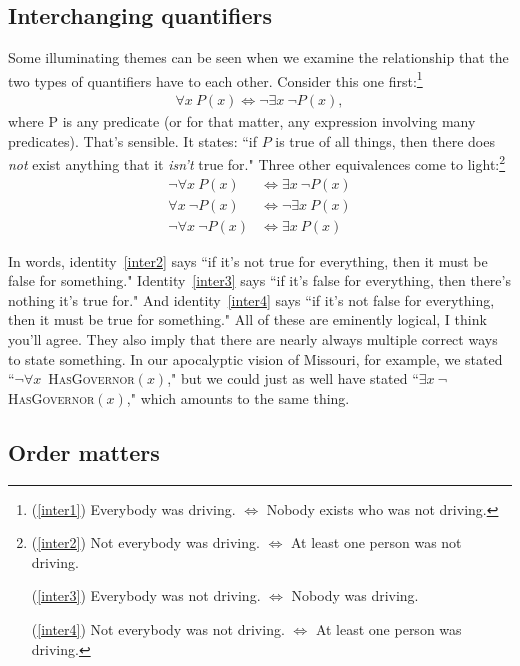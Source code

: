 \subsection{Interchanging quantifiers}

Some illuminating themes can be seen when we examine the relationship that
the two types of quantifiers have to each other. Consider this one first:\footnote{(\ref{inter1}) Everybody was driving. $\Leftrightarrow$ Nobody exists
who was not driving.}
\begin{align}
  \forall x \ P(x) \Leftrightarrow \neg \exists x\ \neg P(x), \label{inter1}
\end{align}
where P is any predicate (or for that matter, any expression involving many
predicates). That's sensible. It states: ``if $P$ is true of all things,
then there does \textit{not} exist anything that it \textit{isn't} true
for." Three other equivalences come to light:\footnote{
(\ref{inter2}) Not everybody was driving. $\Leftrightarrow$ At least one person
was not driving.

\quad (\ref{inter3}) Everybody was not driving. $\Leftrightarrow$ Nobody was driving.

\quad (\ref{inter4}) Not everybody was not driving. $\Leftrightarrow$ At least one
person was driving.
}
\begin{align}
\neg \forall x \ P(x) & \Leftrightarrow \exists x\ \neg P(x)    \label{inter2}\\
     \forall x \ \neg P(x) & \Leftrightarrow \neg \exists x\ P(x)
\label{inter3}\\
\neg \forall x \ \neg P(x) & \Leftrightarrow \exists x\ P(x)
\label{inter4}
\end{align}

In words, identity~\ref{inter2} says ``if it's not true for everything,
then it must be false for something." Identity~\ref{inter3} says ``if it's
false for everything, then there's nothing it's true for." And
identity~\ref{inter4} says ``if it's not false for everything, then it must
be true for something." All of these are eminently logical, I think you'll
agree. They also imply that there are nearly always multiple correct ways
to state something. In our apocalyptic vision of Missouri, for example, we
stated ``$\neg \forall x$\ \textsc{HasGovernor}$(x)$," but we could just as
well have stated ``$\exists x\ \neg$\textsc{HasGovernor}$(x)$," which
amounts to the same thing.

\subsection{Order matters}

